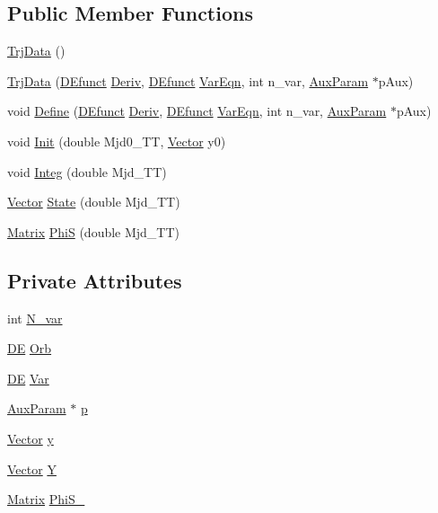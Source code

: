 \subsection*{Public Member Functions}
\begin{DoxyCompactItemize}
\item 
\hyperlink{classTrjData_a5be1aa3fbf88d24e2faad9a83f7f88d6}{Trj\-Data} ()
\item 
\hyperlink{classTrjData_a6cb72c68aee6158def0fd86d4089265e}{Trj\-Data} (\hyperlink{SAT__DE_8h_a37c3f0fc3c33a5b858a3f1c90353da48}{D\-Efunct} \hyperlink{TDRSOD_8cpp_a8ed60f2e5115e2e00c123e12b1cbb649}{Deriv}, \hyperlink{SAT__DE_8h_a37c3f0fc3c33a5b858a3f1c90353da48}{D\-Efunct} \hyperlink{TDRSOD_8cpp_a3df5b7f547d4cb81cae1bbb6d6a2962a}{Var\-Eqn}, int n\-\_\-var, \hyperlink{structAuxParam}{Aux\-Param} $\ast$p\-Aux)
\item 
void \hyperlink{classTrjData_a66f6377ff123744ec416007176bd8754}{Define} (\hyperlink{SAT__DE_8h_a37c3f0fc3c33a5b858a3f1c90353da48}{D\-Efunct} \hyperlink{TDRSOD_8cpp_a8ed60f2e5115e2e00c123e12b1cbb649}{Deriv}, \hyperlink{SAT__DE_8h_a37c3f0fc3c33a5b858a3f1c90353da48}{D\-Efunct} \hyperlink{TDRSOD_8cpp_a3df5b7f547d4cb81cae1bbb6d6a2962a}{Var\-Eqn}, int n\-\_\-var, \hyperlink{structAuxParam}{Aux\-Param} $\ast$p\-Aux)
\item 
void \hyperlink{classTrjData_a8e0165954eeed7e135f6422b4a8362f9}{Init} (double Mjd0\-\_\-\-T\-T, \hyperlink{classVector}{Vector} y0)
\item 
void \hyperlink{classTrjData_a114f2988c11ac55700881e0733369249}{Integ} (double Mjd\-\_\-\-T\-T)
\item 
\hyperlink{classVector}{Vector} \hyperlink{classTrjData_a0aafb034164d6c5741aec8e37328af6f}{State} (double Mjd\-\_\-\-T\-T)
\item 
\hyperlink{classMatrix}{Matrix} \hyperlink{classTrjData_a04f78cff1af058ffea3acfeff85bff94}{Phi\-S} (double Mjd\-\_\-\-T\-T)
\end{DoxyCompactItemize}
\subsection*{Private Attributes}
\begin{DoxyCompactItemize}
\item 
int \hyperlink{classTrjData_ab96d1fb69f9c0f537248905003cf281e}{N\-\_\-var}
\item 
\hyperlink{classDE}{D\-E} \hyperlink{classTrjData_abaee3d46269c1ad0c2d9c91743a35915}{Orb}
\item 
\hyperlink{classDE}{D\-E} \hyperlink{classTrjData_a764f69e7f69595c5b8672f15eabf732f}{Var}
\item 
\hyperlink{structAuxParam}{Aux\-Param} $\ast$ \hyperlink{classTrjData_af249df1d9668d3796f594baca0cfca82}{p}
\item 
\hyperlink{classVector}{Vector} \hyperlink{classTrjData_af327a50e035e18f9fd88b538791e8429}{y}
\item 
\hyperlink{classVector}{Vector} \hyperlink{classTrjData_a083880232f61ac9386f6ccb7820811bc}{Y}
\item 
\hyperlink{classMatrix}{Matrix} \hyperlink{classTrjData_a835dd3a657da0ac63bf72d08844f7759}{Phi\-S\-\_\-}
\end{DoxyCompactItemize}


